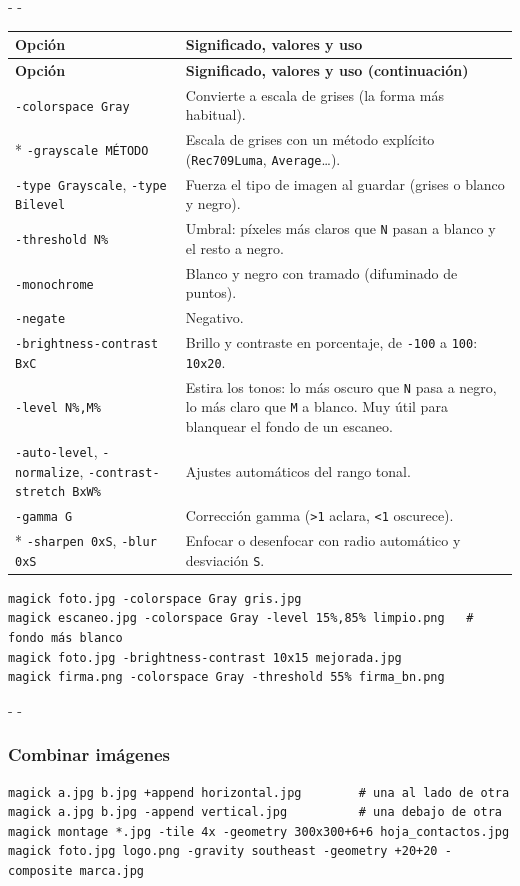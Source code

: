 \documentclass[11pt,a4paper]{article}
\makeatletter
\newcommand{\necesitaespacio}[1]{\par\penalty-100\begingroup
	\setlength{\dimen@}{#1}\dimen@ii\pagegoal\advance\dimen@ii-\pagetotal
	\ifdim\dimen@>\dimen@ii\ifdim\dimen@ii>\z@\vfil\fi\penalty-\@M\fi\endgroup}
\newenvironment{opciones}[1][Opción]{%
	\par\begingroup\small
	\begin{longtable}{L{4.25cm}L{11.2cm}}
		\toprule\rowcolor{tablacab}\cab{#1} & \cab{Significado, valores y uso} \\ \midrule
		\endfirsthead
		\toprule\rowcolor{tablacab}\cab{#1} & \cab{Significado, valores y uso (continuación)} \\ \midrule
		\endhead
		\bottomrule
		\endfoot}
	{\end{longtable}\endgroup}
\newcommand{\opt}[1]{\texttt{\textcolor{colopt}{#1}}}      %
\newcommand{\val}[1]{\texttt{#1}}                          %
\newcommand{\cab}[1]{\textbf{#1}}
\makeatother
\begin{document}
	\necesitaespacio{30\baselineskip}
	\begin{opciones}
		\opt{-colorspace Gray} & Convierte a escala de grises (la forma más habitual).\\*
		\opt{-grayscale MÉTODO} & Escala de grises con un método explícito (\val{Rec709Luma}, \val{Average}\ldots).\\
		\opt{-type Grayscale}, \opt{-type Bilevel} & Fuerza el tipo de imagen al guardar (grises o blanco y negro).\\
		\opt{-threshold N\%} & Umbral: píxeles más claros que \val{N} pasan a blanco y el resto a negro.\\
		\opt{-monochrome} & Blanco y negro con tramado (difuminado de puntos).\\
		\opt{-negate} & Negativo.\\
		\opt{-brightness-\allowbreak{}contrast BxC} & Brillo y contraste en porcentaje, de \val{-100} a \val{100}: \val{10x20}.\\
		\opt{-level N\%,M\%} & Estira los tonos: lo más oscuro que \val{N} pasa a negro, lo más claro que \val{M} a blanco. Muy útil para blanquear el fondo de un escaneo.\\
		\opt{-auto-level}, \opt{-normalize}, \opt{-contrast-\allowbreak{}stretch BxW\%} & Ajustes automáticos del rango tonal.\\
		\opt{-gamma G} & Corrección gamma (\val{>1} aclara, \val{<1} oscurece).\\*
		\opt{-sharpen 0xS}, \opt{-blur 0xS} & Enfocar o desenfocar con radio automático y desviación \val{S}.\\
	\end{opciones}
	
	\begin{lstlisting}
magick foto.jpg -colorspace Gray gris.jpg
magick escaneo.jpg -colorspace Gray -level 15%,85% limpio.png   # fondo más blanco
magick foto.jpg -brightness-contrast 10x15 mejorada.jpg
magick firma.png -colorspace Gray -threshold 55% firma_bn.png
\end{lstlisting}
	
	\necesitaespacio{6\baselineskip}
	\subsubsection{Combinar imágenes}
	
	\begin{lstlisting}
magick a.jpg b.jpg +append horizontal.jpg        # una al lado de otra
magick a.jpg b.jpg -append vertical.jpg          # una debajo de otra
magick montage *.jpg -tile 4x -geometry 300x300+6+6 hoja_contactos.jpg
magick foto.jpg logo.png -gravity southeast -geometry +20+20 -composite marca.jpg
\end{lstlisting}
	
\end{document}

